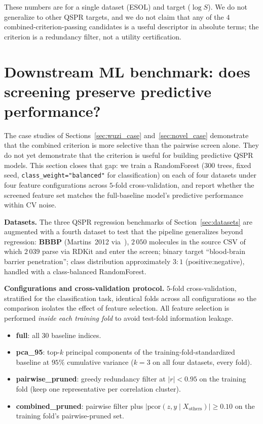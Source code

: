 \documentclass[11pt,a4paper]{article}
\theoremstyle{definition}
\begin{document}
These numbers are for a single dataset (ESOL) and target ($\log S$).
We do not generalize to other QSPR targets, and we do not claim that
any of the $4$ combined-criterion-passing candidates is a useful
descriptor in absolute terms; the criterion is a redundancy filter,
not a utility certification.

\section{Downstream ML benchmark: does screening preserve predictive performance?}\label{sec:ml_benchmark}

The case studies of Sections~\ref{sec:wuzi_case} and~\ref{sec:novel_case}
demonstrate that the combined criterion is more selective than the
pairwise screen alone. They do not yet demonstrate that the criterion
is useful for building predictive QSPR models. This section closes
that gap: we train a RandomForest (300 trees, fixed seed,
\texttt{class\_weight="balanced"} for classification) on each of four
datasets under four feature configurations across $5$-fold
cross-validation, and report whether the screened feature set
matches the full-baseline model's predictive performance within
CV noise.

\textbf{Datasets.} The three QSPR regression benchmarks of
Section~\ref{sec:datasets} are augmented with a fourth dataset to
test that the pipeline generalizes beyond regression:
\textbf{BBBP} (Martins~2012 via~\cite{MoleculeNet}), $2\,050$
molecules in the source CSV of which $2\,039$ parse via RDKit and
enter the screen; binary target ``blood-brain barrier
penetration''; class distribution approximately $3{:}1$
(positive:negative), handled with a class-balanced RandomForest.

\textbf{Configurations and cross-validation protocol.} $5$-fold
cross-validation, stratified for the classification task, identical
folds across all configurations so the comparison isolates the
effect of feature selection. All feature selection is performed
\emph{inside each training fold} to avoid test-fold information
leakage.
\begin{itemize}
\item \textbf{full}: all $30$ baseline indices.
\item \textbf{pca\_95}: top-$k$ principal components of the
training-fold-standardized baseline at $95\%$ cumulative variance
($k=3$ on all four datasets, every fold).
\item \textbf{pairwise\_pruned}: greedy redundancy filter at
$|r| < 0.95$ on the training fold (keep one representative per
correlation cluster).
\item \textbf{combined\_pruned}: pairwise filter plus
$|\mathrm{pcor}(z, y \mid X_{\mathrm{others}})| \ge 0.10$ on the
training fold's pairwise-pruned set.
\end{itemize}
\end{document}
